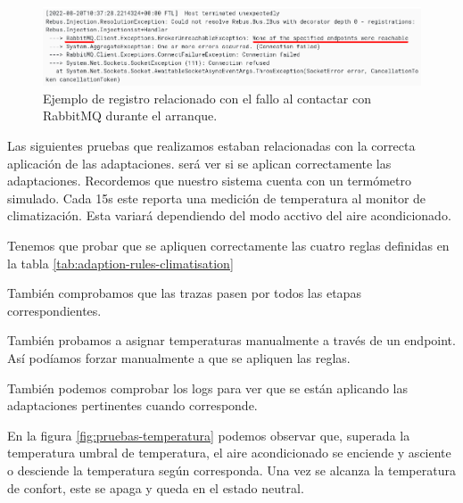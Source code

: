 \begin{figure}[htb]
  \centering
  \includegraphics[scale=0.45]{cap_despliegue/images/Logs-fallo-RabbitMQ}
  \caption{Ejemplo de registro relacionado con el fallo al contactar con RabbitMQ durante el arranque.}
  \label{fig:prueba-logs-error-rabbitmq}
\end{figure}

Las siguientes pruebas que realizamos estaban relacionadas con la correcta aplicación de las adaptaciones. será ver si se aplican correctamente las adaptaciones. Recordemos que nuestro sistema cuenta con un termómetro simulado. Cada 15s este reporta una medición de temperatura al monitor de climatización. Esta variará dependiendo del modo acctivo del aire acondicionado.

Tenemos que probar que se apliquen correctamente las cuatro reglas definidas en la tabla \ref{tab:adaption-rules-climatisation}

También comprobamos que las trazas pasen por todos las etapas correspondientes.


También probamos a asignar temperaturas manualmente a través de un endpoint. Así podíamos forzar manualmente a que se apliquen las reglas.

También podemos comprobar los logs para ver que se están aplicando las adaptaciones pertinentes cuando corresponde.

En la figura \ref{fig:pruebas-temperatura} podemos observar que, superada la temperatura umbral de temperatura, el aire acondicionado se enciende y asciente o desciende la temperatura según corresponda. Una vez se alcanza la temperatura de confort, este se apaga y queda en el estado neutral.

